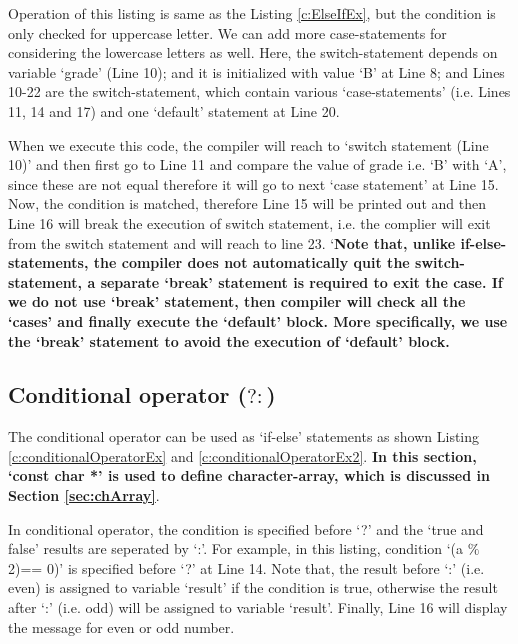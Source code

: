 \begin{explanation}
	Operation of this listing is same as the Listing \ref{c:ElseIfEx}, but the condition is only checked for uppercase letter. We can add more case-statements for considering the lowercase letters as well. Here, the switch-statement depends on variable `grade' (Line 10); and it is initialized with value `B' at Line 8; and Lines 10-22 are the switch-statement, which contain various `case-statements' (i.e. Lines 11, 14 and 17) and one `default' statement at Line 20. 
	
	When we execute this code, the compiler will reach to `switch statement (Line 10)' and then first go to Line 11 and compare the value of grade i.e. `B' with `A', since these are not equal therefore it will go to next `case statement' at Line 15. Now, the condition is matched, therefore Line 15 will be printed out and then Line 16 will break the execution of switch statement, i.e. the complier will exit from the switch statement and will reach to line 23. `\textbf{Note that, unlike if-else-statements, the compiler does not automatically quit the switch-statement, a separate `break' statement is required to exit the case. If we do not use `break' statement, then compiler will check all the `cases' and finally execute the `default' block. More specifically, we use the `break' statement to avoid the execution of `default' block.}
	
	
\end{explanation}



\subsection{Conditional operator ($? :$)}
	The conditional operator can be used as `if-else' statements as shown Listing \ref{c:conditionalOperatorEx} and \ref{c:conditionalOperatorEx2}. \textbf{In this section, `const char *' is used to define character-array, which is discussed in Section \ref{sec:chArray}}.
	
	\begin{explanation}
		In conditional operator, the condition is specified before `?' and the `true and false' results are seperated by `:'. For example, in this listing, condition `(a $\%$2)== 0)' is specified before `?' at Line 14. Note that, the result before `:' (i.e. even)  is assigned to variable `result' if the condition is true, otherwise the result after `:' (i.e. odd) will be assigned to variable `result'. Finally, Line 16 will display the message for even or odd number. 
	\end{explanation}
	
